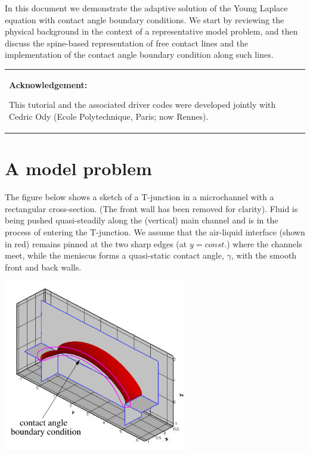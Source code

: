 In this document we demonstrate the adaptive solution of the Young Laplace equation with contact angle boundary conditions. We start by reviewing the physical background in the context of a representative model problem, and then discuss the spine-\/based representation of free contact lines and the implementation of the contact angle boundary condition along such lines.

\begin{center} \tabulinesep=1mm
\begin{longtabu} spread 0pt [c]{*{1}{|X[-1]}|}
\hline
\begin{center} {\bfseries Acknowledgement\+:} \end{center}  This tutorial and the associated driver codes were developed jointly with Cedric Ody (Ecole Polytechnique, Paris; now Rennes). ~\newline
~\newline
  \\
\end{longtabu}
\end{center} 



 

\hypertarget{index_model}{}\section{A model problem}\label{index_model}
The figure below shows a sketch of a T-\/junction in a microchannel with a rectangular cross-\/section. (The front wall has been removed for clarity). Fluid is being pushed quasi-\/steadily along the (vertical) main channel and is in the process of entering the T-\/junction. We assume that the air-\/liquid interface (shown in red) remains pinned at the two sharp edges (at $ y=const.$) where the channels meet, while the meniscus forms a quasi-\/static contact angle, $ \gamma $, with the smooth front and back walls.

 
\begin{DoxyImage}
\includegraphics[width=0.6\textwidth]{t_junction_contact_angle_sketch}
\end{DoxyImage}


